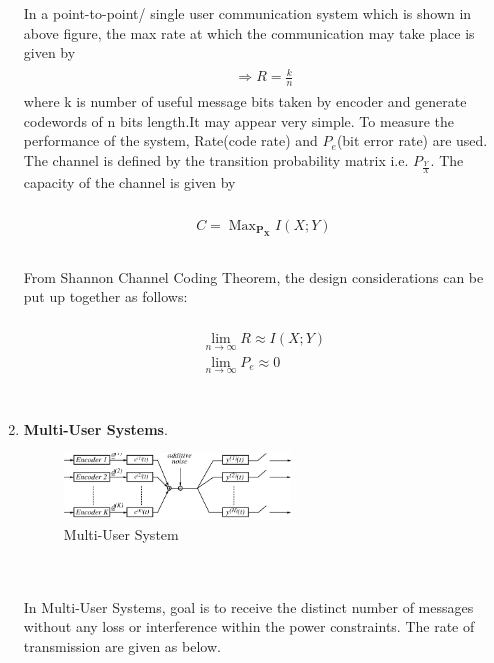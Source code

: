 \documentclass[a4paper]{article}
\DeclareMathOperator*{\maxi}{Max}
\begin{document}
\begin{enumerate}
In a point-to-point/ single user communication system which is shown in above figure, the max rate at which the communication may take place is given by
\begin{align}
\begin{split}
	\Rightarrow R = \frac{k}{n}
\end{split}
\end{align}
where k is number of useful message bits taken by encoder and generate codewords of n bits length.It may appear very simple. To measure the performance of the system, Rate(code rate) and $P_e$(bit error rate) are used. The channel is defined by the transition probability matrix i.e. $P_\frac{Y}{X}$. The capacity of the channel is given by\\
\\
\begin{align}
\begin{split}
C=\maxi_{\mathbf{P_X}} I(X;Y)\\
\end{split}
\end{align}
\\
From Shannon Channel Coding Theorem, the design considerations can be put up together as follows:
\\
\\
\begin{align}
\begin{split}
\lim_{n \to \infty} R \approx I(X;Y)\\
\lim_{n \to \infty} P_e \approx 0\\
\end{split}
\end{align}
\\
\item \textbf{Multi-User Systems}.\\
\begin{figure}[!ht]
\centering
\includegraphics[width=6.0cm]{multi-user-systems.png}
\caption{Multi-User System}\label{fig:3}
\end{figure} \\
\\
In Multi-User Systems, goal is to receive the distinct number of messages without any loss or interference within the power constraints. The rate of transmission are given as below.
\\

\end{enumerate}
\end{document}
